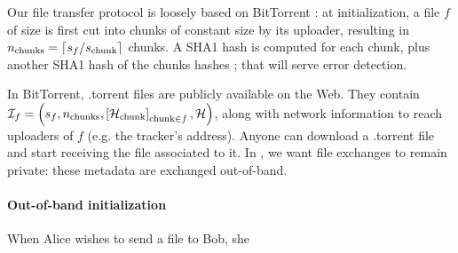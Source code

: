 Our file transfer protocol is loosely based on BitTorrent \cite{bt_bep3}: 
at initialization, a file $f$ of size \filesize is first cut into chunks of constant size \chunksize by its uploader,
resulting in $n_{\text{chunks}} = \lceil s_f / s_{\text{chunk}} \rceil$ chunks.
A SHA1 hash \hashchunk is computed for each chunk, plus another SHA1 hash \hashfile of the chunks hashes ; that will serve error detection. 


In BitTorrent, .torrent files are publicly available on the Web.
They contain $\mathcal{I}_f = \left(s_f, n_{\text{chunks}}, \left[\mathcal{H}_{\text{chunk}}\right]_{\text{chunk} \in f}, \mathcal{H}\right)$, 
along with network information to reach uploaders of $f$ (e.g. the tracker's address).
Anyone can download a .torrent file and start receiving the file associated to it.
In \name, we want file exchanges to remain private: these metadata are exchanged out-of-band.

\paragraph{Out-of-band initialization} 
When Alice wishes to send a file to Bob, she 
